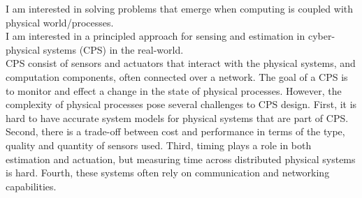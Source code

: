 \documentclass[10pt]{article}
\date{}
\begin{document}


\title{{\Large  }}
\vspace{-1em}
\maketitle

\vspace{-12em}


I am interested in solving problems that emerge when computing is coupled with physical world/processes. \\
I am interested in a principled approach for sensing and estimation in cyber-physical systems (CPS) in the real-world. \\
CPS consist of sensors and actuators that interact with the physical systems, and computation components, often connected over a network.
The goal of a CPS is to monitor and effect a change in the state of physical processes. However, the complexity of physical processes pose several challenges to CPS design.
First, it is hard to have accurate system models for physical systems that are part of CPS. Second, there is a trade-off between cost and performance in terms of the type, quality and quantity of sensors used.  Third, timing plays a role in both estimation and actuation, but measuring time across distributed physical systems is hard. Fourth, these systems often rely on communication and networking capabilities. 
\end{document}
